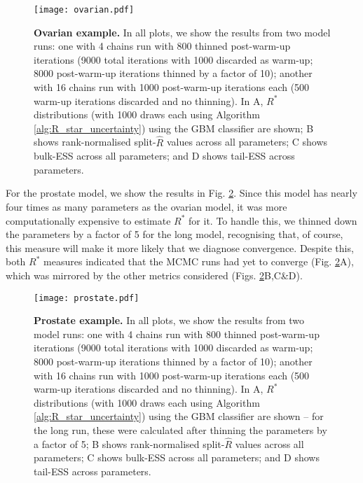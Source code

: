 \documentclass{article}
\begin{document}
\begin{figure}[!htb]
	\centerline{\texttt{[image: ovarian.pdf]}}
	\caption{\textbf{Ovarian example.} In all plots, we show the results from two model runs: one with 4 chains run with 800 thinned post-warm-up iterations (9000 total iterations with 1000 discarded as warm-up; 8000 post-warm-up iterations thinned by a factor of 10); another with 16 chains run with 1000 post-warm-up iterations each (500 warm-up iterations discarded and no thinning). In A, $R^*$ distributions (with 1000 draws each using Algorithm \ref{alg:R_star_uncertainty}) using the GBM classifier are shown; B shows rank-normalised split-$\widehat{R}$ values across all parameters; C shows bulk-ESS across all parameters; and D shows tail-ESS across parameters.}
	\label{fig:ovarian}
\end{figure}

For the prostate model, we show the results in Fig. \ref{fig:prostate}. Since this model has nearly four times as many parameters as the ovarian model, it was more computationally expensive to estimate $R^*$ for it. To handle this, we thinned down the parameters by a factor of 5 for the long model, recognising that, of course, this measure will make it more likely that we diagnose convergence. Despite this, both $R^*$ measures indicated that the MCMC runs had yet to converge (Fig. \ref{fig:prostate}A), which was mirrored by the other metrics considered (Figs. \ref{fig:prostate}B,C\&D).

\begin{figure}[!htb]
	\centerline{\texttt{[image: prostate.pdf]}}
	\caption{\textbf{Prostate example.} In all plots, we show the results from two model runs: one with 4 chains run with 800 thinned post-warm-up iterations (9000 total iterations with 1000 discarded as warm-up; 8000 post-warm-up iterations thinned by a factor of 10); another with 16 chains run with 1000 post-warm-up iterations each (500 warm-up iterations discarded and no thinning). In A, $R^*$ distributions (with 1000 draws each using Algorithm \ref{alg:R_star_uncertainty}) using the GBM classifier are shown -- for the long run, these were calculated after thinning the parameters by a factor of 5; B shows rank-normalised split-$\widehat{R}$ values across all parameters; C shows bulk-ESS across all parameters; and D shows tail-ESS across parameters.}
	\label{fig:prostate}
\end{figure}

\color{red}
\end{document}
